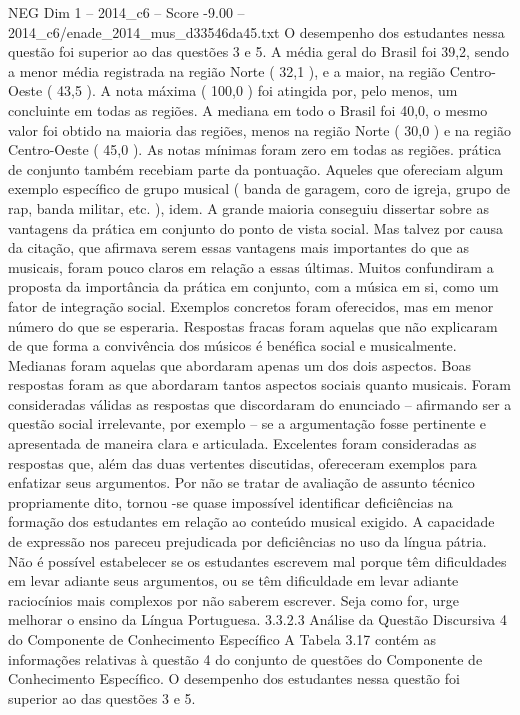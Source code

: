 \begin{textsample}{NEG Dim 1 – 2014\_c6 – Score -9.00 – 2014\_c6/enade\_2014\_mus\_d33546da45.txt}
O desempenho dos estudantes nessa questão foi superior ao das questões 3 e 5.
A média geral do Brasil foi 39,2, sendo a menor média registrada na região Norte ( 32,1 ), e a maior, na região Centro-Oeste ( 43,5 ).
A nota máxima ( 100,0 ) foi atingida por, pelo menos, um concluinte em todas as regiões.
A mediana em todo o Brasil foi 40,0, o mesmo valor foi obtido na maioria das regiões, menos na região Norte ( 30,0 ) e na região Centro-Oeste ( 45,0 ).
As notas mínimas foram zero em todas as regiões. prática de conjunto também recebiam parte da pontuação.
Aqueles que ofereciam algum exemplo específico de grupo musical ( banda de garagem, coro de igreja, grupo de rap, banda militar, etc. ), idem.
A grande maioria conseguiu dissertar sobre as vantagens da prática em conjunto do ponto de vista social.
Mas talvez por causa da citação, que afirmava serem essas vantagens mais importantes do que as musicais, foram pouco claros em relação a essas últimas.
Muitos confundiram a proposta da importância da prática em conjunto, com a música em si, como um fator de integração social.
Exemplos concretos foram oferecidos, mas em menor número do que se esperaria.
Respostas fracas foram aquelas que não explicaram de que forma a convivência dos músicos é benéfica social e musicalmente.
Medianas foram aquelas que abordaram apenas um dos dois aspectos.
Boas respostas foram as que abordaram tantos aspectos sociais quanto musicais.
Foram consideradas válidas as respostas que discordaram do enunciado – afirmando ser a questão social irrelevante, por exemplo – se a argumentação fosse pertinente e apresentada de maneira clara e articulada.
Excelentes foram consideradas as respostas que, além das duas vertentes discutidas, ofereceram exemplos para enfatizar seus argumentos.
Por não se tratar de avaliação de assunto técnico propriamente dito, tornou -se quase impossível identificar deficiências na formação dos estudantes em relação ao conteúdo musical exigido.
A capacidade de expressão nos pareceu prejudicada por deficiências no uso da língua pátria.
Não é possível estabelecer se os estudantes escrevem mal porque têm dificuldades em levar adiante seus argumentos, ou se têm dificuldade em levar adiante raciocínios mais complexos por não saberem escrever.
Seja como for, urge melhorar o ensino da Língua Portuguesa. 3.3.2.3 Análise da Questão Discursiva 4 do Componente de Conhecimento Específico A Tabela 3.17 contém as informações relativas à questão 4 do conjunto de questões do Componente de Conhecimento Específico.
O desempenho dos estudantes nessa questão foi superior ao das questões 3 e 5.

\end{textsample}
